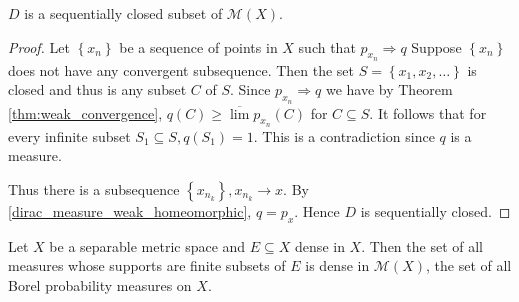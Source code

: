 \begin{lem}
	\( D \) is a sequentially closed subset of \( \mathscr { M } ( X ) \).
\end{lem}

\begin{proof}
	Let \( \left\{ x _ { n } \right\} \) be a sequence of points in \( X \) such that \( p _ { x _ { n } } \Rightarrow q \) Suppose \( \left\{ x _ { n } \right\} \) does not have any convergent subsequence. Then the set \( S = \left\{ x _ { 1 } , x _ { 2 } , \ldots \right\} \) is closed and thus is any subset \( C \) of \( S . \) Since \( p _ { x _ { n } } \Rightarrow q \) we have by Theorem \cref{thm:weak_convergence}, \( q ( C ) \geqslant \overline { \lim } p _ { x _ { n } } ( C ) \) for \( C \subseteq S \). It follows that for every infinite subset \( S _ { 1 } \subseteq S , q \left( S _ { 1 } \right) = 1 \). This is a contradiction since \( q \) is a measure.

	Thus there is a subsequence \( \left\{ x _ { n _ { k } } \right\} , x _ { n _ { k } } \rightarrow x . \) By \cref{dirac_measure_weak_homeomorphic}, \( q = p _ { x } \). Hence \( D \) is sequentially closed.
\end{proof}


\begin{thm}
	\label{finite_support_approximation}
	Let \( X \) be a separable metric space and \( E \subseteq X \) dense in \( X  \). Then the set of all measures whose supports are finite subsets of \( E \) is dense in \( \mathscr{ M } ( X ) \), the set of all Borel probability measures on $X$.
\end{thm}

